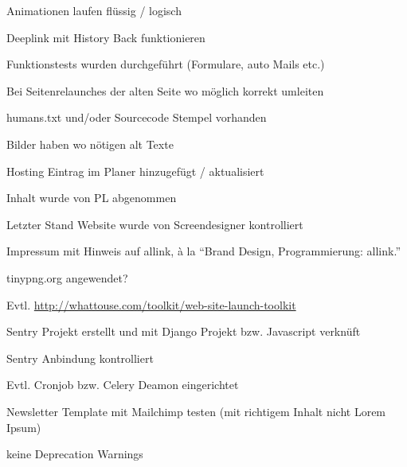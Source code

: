 \begin{checklist}
  \item Animationen laufen flüssig / logisch
  \item Deeplink mit History Back funktionieren
  \item Funktionstests wurden durchgeführt (Formulare, auto Mails etc.)
  \item Bei Seitenrelaunches  der alten Seite wo möglich korrekt umleiten
  \item humans.txt und/oder Sourcecode Stempel vorhanden
  \item Bilder haben wo nötigen alt Texte
  \item Hosting Eintrag im Planer hinzugefügt / aktualisiert
  \item Inhalt wurde von PL abgenommen
  \item Letzter Stand Website wurde von Screendesigner kontrolliert
  \item Impressum mit Hinweis auf allink, à la ``Brand Design, Programmierung: allink.''
  \item tinypng.org angewendet?
  \item Evtl. \url{http://whattouse.com/toolkit/web-site-launch-toolkit}
  \item Sentry Projekt erstellt und mit Django Projekt bzw. Javascript verknüft
  \item Sentry Anbindung kontrolliert
  \item Evtl. Cronjob bzw. Celery Deamon eingerichtet
  \item Newsletter Template mit Mailchimp testen (mit richtigem Inhalt nicht Lorem Ipsum)
  \item keine Deprecation Warnings
\end{checklist}
